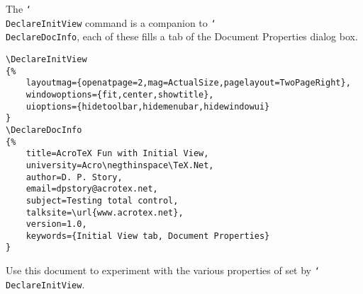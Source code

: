 \documentclass{article}
\newcommand{\cs}[1]{\texttt{\char`\\#1}}
\begin{document}
\maketitle

\noindent The \cs{DeclareInitView} command is a companion to
\cs{DeclareDocInfo}, each of these fills a tab of the
\textsf{Document Properties} dialog box.

\begin{verbatim}
\DeclareInitView
{%
    layoutmag={openatpage=2,mag=ActualSize,pagelayout=TwoPageRight},
    windowoptions={fit,center,showtitle},
    uioptions={hidetoolbar,hidemenubar,hidewindowui}
}
\DeclareDocInfo
{%
    title=AcroTeX Fun with Initial View,
    university=Acro\negthinspace\TeX.Net,
    author=D. P. Story,
    email=dpstory@acrotex.net,
    subject=Testing total control,
    talksite=\url{www.acrotex.net},
    version=1.0,
    keywords={Initial View tab, Document Properties}
}
\end{verbatim}
Use this document to experiment with the various
properties of set by \cs{DeclareInitView}.

\newpage
\end{document}
